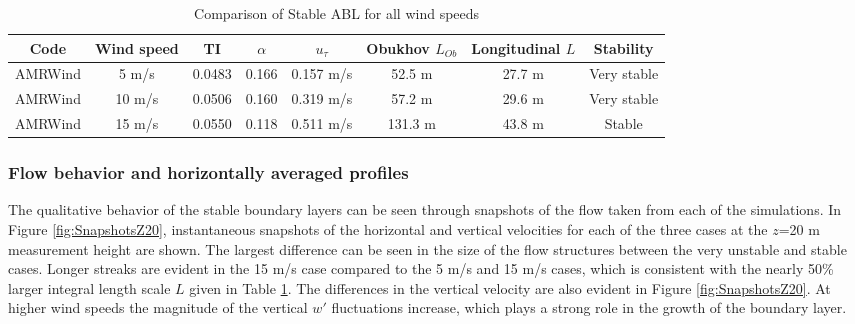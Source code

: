 \begin{table}
\caption{\label{tab:CompareAMRallWS} Comparison of Stable ABL for all
  wind speeds} \centering
\begin{tabular}{cccccccc}
  \hline
  Code & Wind speed   & TI     & $\alpha$& $u_\tau$ & Obukhov $L_{Ob}$ & Longitudinal $L$ & Stability \\
  \hline
  AMRWind & 5 m/s      & 0.0483 &  0.166 &  0.157 m/s  &  52.5 m & 27.7 m  & Very stable\\
  AMRWind & 10 m/s     & 0.0506 &  0.160 &  0.319 m/s  &  57.2 m & 29.6 m  & Very stable\\
  AMRWind & 15 m/s     & 0.0550 &  0.118 &  0.511 m/s  & 131.3 m & 43.8 m  & Stable \\
  \hline
\end{tabular}
\end{table}

\subsubsection{Flow behavior and horizontally averaged profiles}

The qualitative behavior of the stable boundary layers can be seen
through snapshots of the flow taken from each of the simulations.  In
Figure \ref{fig:SnapshotsZ20}, instantaneous snapshots of the
horizontal and vertical velocities for each of the three cases at the
$z$=20 m measurement height are shown.  The largest difference can be
seen in the size of the flow structures between the very unstable and
stable cases.  Longer streaks are evident in the 15 m/s case compared
to the 5 m/s and 15 m/s cases, which is consistent with the nearly
50\% larger integral length scale $L$ given in Table
\ref{tab:CompareAMRallWS}.  The differences in the vertical velocity
are also evident in Figure  \ref{fig:SnapshotsZ20}.  At higher wind speeds the
magnitude of the vertical $w'$ fluctuations increase, which plays a
strong role in the growth of the boundary layer.

